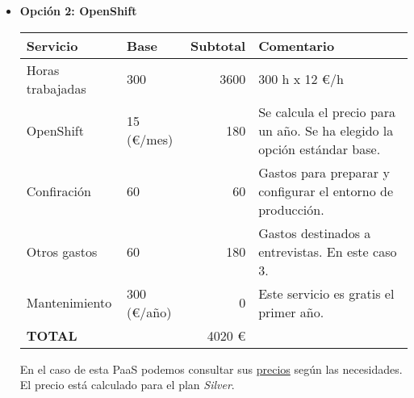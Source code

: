 \begin{itemize}
\item \textbf{Opción 2: OpenShift}
\begin{center}
    \begin{tabular}{| l | l | r | p{5cm} |}
    \hline
    Servicio & Base & Subtotal & Comentario \\ \hline
    Horas trabajadas & 300 & 3600 & 300 h x 12 \euro/h \\ \hline
    OpenShift & 15 (\euro/mes) & 180 & Se calcula el precio para un año. Se ha elegido la opción estándar base.\\ \hline
    Confiración & 60 & 60 & Gastos para preparar y configurar el entorno de producción. \\ \hline 
    Otros gastos & 60 & 180 & Gastos destinados a entrevistas. En este caso 3. \\ \hline 
    Mantenimiento & 300 (\euro/año) & 0 & Este servicio es gratis el primer año. \\ \hline
    \textbf{TOTAL} &  & 4020 \euro & \\
    \hline
    \end{tabular}
\end{center}

En el caso de esta PaaS podemos consultar sus \href{https://www.openshift.com/products/pricing/plan-comparison}{precios} según las necesidades. El precio está calculado para el plan \emph{Silver}.

\end{itemize}